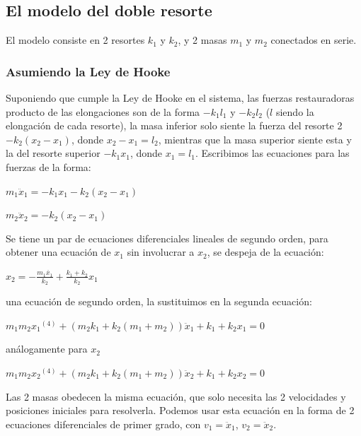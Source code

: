 \documentclass[a4paper]{article}
\begin{document}
\subsection{El modelo del doble resorte}

El modelo consiste en 2 resortes $k_1$ y $k_2$, y 2 masas $m_1$ y $m_2$ conectados en serie.

\subsubsection{Asumiendo la Ley de Hooke}

Suponiendo que  cumple la Ley de Hooke en el sistema, las fuerzas restauradoras producto de las elongaciones son de la forma $-k_1 l_1$ y $-k_2 l_2$ ($l$ siendo la elongación de cada resorte), la masa inferior solo siente la fuerza del resorte 2 $-k_2 (x_2 - x_1)$, donde $x_2 - x_1 = l_2$, mientras que la masa superior siente esta y la del resorte superior $-k_1 x_1$, donde $x_1 = l_1$. Escribimos las ecuaciones para las fuerzas de la forma:

\begin{center}
	$m_1 \ddot{x}_1 = - k_1 x_1 - k_2 (x_2 - x_1)$

	$m_2 \ddot{x}_2 = -k_2 (x_2 - x_1)$
\end{center}

Se tiene un par de ecuaciones diferenciales lineales de segundo orden, para obtener una ecuación de $x_1$ sin involucrar a $x_2$, se despeja de la ecuación:

\begin{center}
	$x_2 = -\frac{m_1 \ddot{x_1}}{k_2} + \frac{k_1 + k_2}{k_2} x_1$
\end{center}

una ecuación de segundo orden, la sustituimos en la segunda ecuación:

\begin{center}
$m_1 m_2 {x_1}^{(4)} + (m_2 k_1 + k_2 (m_1 + m_2)) \ddot{x}_1 + k_1 + k_2 x_1 = 0$
\end{center}

análogamente para $x_2$

\begin{center}
$m_1 m_2 {x_2}^{(4)} + (m_2 k_1 + k_2 (m_1 + m_2)) \ddot{x}_2 + k_1 + k_2 x_2 = 0$
\end{center}

Las 2 masas obedecen la misma ecuación, que solo necesita las 2 velocidades y posiciones iniciales para resolverla.  Podemos usar esta ecuación en la forma de 2 ecuaciones diferenciales de primer grado, con $v_1 = \ddot{x}_1$, $v_2 = \ddot{x}_2$.
\end{document}
